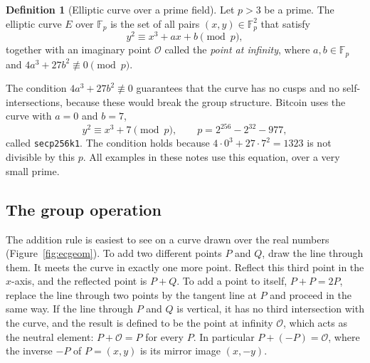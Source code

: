 \documentclass[11pt,a4paper]{article}
\theoremstyle{definition}
\newtheorem{definition}{Definition}[section]
\newcommand{\F}{\mathbb{F}}
\begin{document}
\begin{definition}[Elliptic curve over a prime field]
Let $p>3$ be a prime. The elliptic curve $E$ over $\F_p$ is the set of all pairs $(x,y)\in\F_p^2$ that satisfy
\[
y^2\equiv x^3+ax+b \pmod p,
\]
together with an imaginary point $\mathcal{O}$ called the \emph{point at infinity}, where $a,b\in\F_p$ and $4a^3+27b^2\not\equiv 0 \pmod p$.
\end{definition}

The condition $4a^3+27b^2\not\equiv 0$ guarantees that the curve has no cusps and no self-intersections, because these would break the group structure. Bitcoin uses the curve with $a=0$ and $b=7$,
\[
y^2\equiv x^3+7 \pmod p,\qquad p=2^{256}-2^{32}-977,
\]
called \texttt{secp256k1}. The condition holds because $4\cdot 0^3+27\cdot 7^2=1323$ is not divisible by this $p$. All examples in these notes use this equation, over a very small prime.

\subsection{The group operation}

The addition rule is easiest to see on a curve drawn over the real numbers (Figure~\ref{fig:ecgeom}). To add two different points $P$ and $Q$, draw the line through them. It meets the curve in exactly one more point. Reflect this third point in the $x$-axis, and the reflected point is $P+Q$. To add a point to itself, $P+P=2P$, replace the line through two points by the tangent line at $P$ and proceed in the same way. If the line through $P$ and $Q$ is vertical, it has no third intersection with the curve, and the result is defined to be the point at infinity $\mathcal{O}$, which acts as the neutral element: $P+\mathcal{O}=P$ for every $P$. In particular $P+(-P)=\mathcal{O}$, where the inverse $-P$ of $P=(x,y)$ is its mirror image $(x,-y)$.
\end{document}
